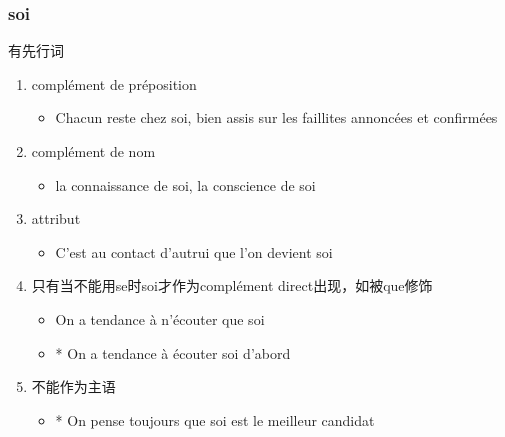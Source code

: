 \documentclass[UTF8]{report}
\begin{document}
\subsubsection{soi}
有先行词
\begin{enumerate}
    \item complément de préposition
    \begin{itemize}
        \item Chacun reste chez soi, bien assis sur les faillites annoncées et confirmées
    \end{itemize}
    \item complément de nom
    \begin{itemize}
        \item la connaissance de soi, la conscience de soi
    \end{itemize}
    \item attribut
    \begin{itemize}
        \item C’est au contact d’autrui que l’on devient soi
    \end{itemize}
    \item 只有当不能用se时soi才作为complément direct出现，如被que修饰
    \begin{itemize}
        \item On a tendance à n’écouter que soi
        \item * On a tendance à écouter soi d’abord
    \end{itemize}
    \item 不能作为主语
    \begin{itemize}
        \item * On pense toujours que soi est le meilleur candidat
    \end{itemize}
\end{enumerate}
\end{document}
